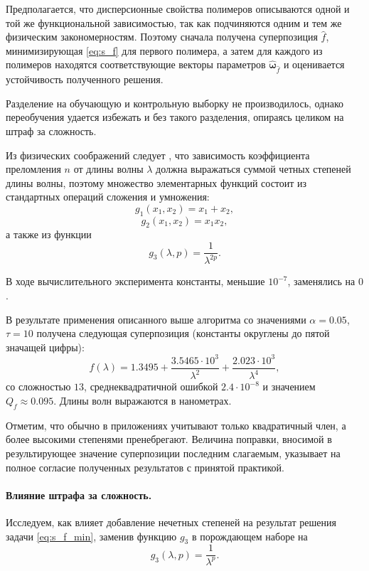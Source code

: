 \documentclass[11pt,a4paper]{article}
\theoremstyle{definition}
\begin{document}
Предполагается, что дисперсионные свойства полимеров описываются одной и той
же функциональной зависимостью, так как подчиняются одним и тем же физическим
закономерностям. Поэтому сначала получена суперпозиция $\hat{f}$,
минимизирующая \eqref{eq:s_f} для первого полимера, а затем для каждого
из полимеров находятся соответствующие векторы параметров
$\hat{\boldsymbol{\omega}}_{\hat{f}}$ и оценивается устойчивость полученного решения.

Разделение на обучающую и контрольную выборку не производилось, однако переобучения
удается избежать и без такого разделения, опираясь целиком на штраф за сложность.

Из физических соображений следует \cite{Serova11}, что зависимость коэффициента
преломления $n$ от длины волны $\lambda$ должна выражаться суммой
четных степеней длины волны, поэтому множество элементарных функций состоит из
стандартных операций сложения и умножения:
\[
  g_1(x_1, x_2) = x_1 + x_2,
\]
\[
  g_2(x_1, x_2) = x_1 x_2,
\]
а также из функции
\[
  g_3(\lambda, p) = \frac{1}{\lambda^{2p}}.
\]

В ходе вычислительного эксперимента константы, меньшие $10^{-7}$,
заменялись на $0$.

В результате применения описанного выше алгоритма со значениями
$\alpha = 0.05$, $\tau = 10$ получена следующая суперпозиция
(константы округлены до пятой значащей цифры):
\begin{equation}
  f(\lambda) = 1.3495 + \frac{3.5465 \cdot 10^3}{\lambda^2} + \frac{2.023 \cdot 10^3}{\lambda^4},
  \label{eq:res_0}
\end{equation}
со сложностью $13$, среднеквадратичной ошибкой $2.4 \cdot 10^{-8}$ и значением $Q_f \approx 0.095$.
Длины волн выражаются в нанометрах.

Отметим, что обычно в приложениях учитывают только квадратичный член, а более
высокими степенями пренебрегают. Величина поправки, вносимой в результирующее значение
суперпозиции последним слагаемым, указывает на полное согласие полученных результатов
с принятой практикой.

\paragraph{Влияние штрафа за сложность.}

Исследуем, как влияет добавление нечетных степеней на результат решения задачи \eqref{eq:s_f_min},
заменив функцию $g_3$ в порождающем наборе на
\[
  g_3(\lambda, p) = \frac{1}{\lambda^p}.
\]
\end{document}
